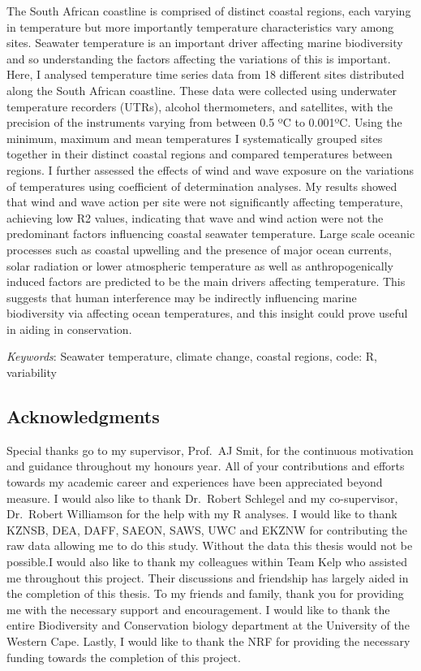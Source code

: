 \documentclass[12pt,A4paper,]{article}
\begin{document}
The South African coastline is comprised of distinct coastal regions,
each varying in temperature but more importantly temperature
characteristics vary among sites. Seawater temperature is an important
driver affecting marine biodiversity and so understanding the factors
affecting the variations of this is important. Here, I analysed
temperature time series data from 18 different sites distributed along
the South African coastline. These data were collected using underwater
temperature recorders (UTRs), alcohol thermometers, and satellites, with
the precision of the instruments varying from between 0.5 ºC to 0.001ºC.
Using the minimum, maximum and mean temperatures I systematically
grouped sites together in their distinct coastal regions and compared
temperatures between regions. I further assessed the effects of wind and
wave exposure on the variations of temperatures using coefficient of
determination analyses. My results showed that wind and wave action per
site were not significantly affecting temperature, achieving low R2
values, indicating that wave and wind action were not the predominant
factors influencing coastal seawater temperature. Large scale oceanic
processes such as coastal upwelling and the presence of major ocean
currents, solar radiation or lower atmospheric temperature as well as
anthropogenically induced factors are predicted to be the main drivers
affecting temperature. This suggests that human interference may be
indirectly influencing marine biodiversity via affecting ocean
temperatures, and this insight could prove useful in aiding in
conservation.

\emph{Keywords}: Seawater temperature, climate change, coastal regions,
code: R, variability

\newpage

\subsection{Acknowledgments}\label{acknowledgments}

Special thanks go to my supervisor, Prof.~AJ Smit, for the continuous
motivation and guidance throughout my honours year. All of your
contributions and efforts towards my academic career and experiences
have been appreciated beyond measure. I would also like to thank
Dr.~Robert Schlegel and my co-supervisor, Dr.~Robert Williamson for the
help with my R analyses. I would like to thank KZNSB, DEA, DAFF, SAEON,
SAWS, UWC and EKZNW for contributing the raw data allowing me to do this
study. Without the data this thesis would not be possible.I would also
like to thank my colleagues within Team Kelp who assisted me throughout
this project. Their discussions and friendship has largely aided in the
completion of this thesis. To my friends and family, thank you for
providing me with the necessary support and encouragement. I would like
to thank the entire Biodiversity and Conservation biology department at
the University of the Western Cape. Lastly, I would like to thank the
NRF for providing the necessary funding towards the completion of this
project.
\end{document}
